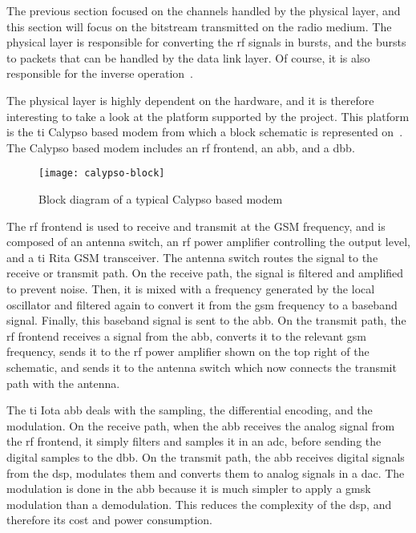     The previous section focused on the channels handled by the physical
    layer, and this section will focus on the bitstream transmitted on
    the radio medium. The physical layer is responsible for converting
    the \gls{rf} signals in bursts, and the bursts to packets that can
    be handled by the data link layer. Of course, it is also responsible
    for the inverse operation~\cite{3gpp_ts_2015-3,osmocombb_2015,welte_anatomy_2010}.

    The physical layer is highly dependent on the hardware, and it is
    therefore interesting to take a look at the platform supported by
    the  project. This platform is the \gls{ti} Calypso
    based modem from which a block schematic is represented
    on~. The Calypso based modem includes an
    \gls{rf} frontend, an \gls{abb}, and a \gls{dbb}.

    \begin{figure}[h]
      \centering
      \texttt{[image: calypso-block]}
      \caption{Block diagram of a typical Calypso based
              modem~\cite{welte_anatomy_2010}}
      \label{fig:calypso_modem}
    \end{figure}

    The \gls{rf} frontend is used to receive and transmit at the GSM
    frequency, and is composed of an antenna switch, an \gls{rf} power
    amplifier controlling the output level, and a \gls{ti} Rita GSM
    transceiver. The antenna switch routes the signal to the receive or
    transmit path. On the receive path, the signal is filtered and
    amplified to prevent noise. Then, it is mixed with a frequency
    generated by the local oscillator and filtered again to convert it
    from the \gls{gsm} frequency to a baseband signal. Finally, this
    baseband signal is sent to the \gls{abb}. On the transmit path, the
    \gls{rf} frontend receives a signal from the \gls{abb}, converts it
    to the relevant \gls{gsm} frequency, sends it to the \gls{rf} power
    amplifier shown on the top right of the schematic, and sends it to
    the antenna switch which now connects the transmit path with the
    antenna.

    The \gls{ti} Iota \gls{abb} deals with the sampling, the
    differential encoding, and the modulation. On the receive path, when
    the \gls{abb} receives the analog signal from the \gls{rf} frontend,
    it simply filters and samples it in an \gls{adc}, before sending the
    digital samples to the \gls{dbb}. On the transmit path, the
    \gls{abb} receives digital signals from the \gls{dsp}, modulates
    them and converts them to analog signals in a \gls{dac}. The
    modulation is done in the \gls{abb} because it is much simpler to
    apply a \gls{gmsk} modulation than a demodulation. This reduces the
    complexity of the \gls{dsp}, and therefore its cost and power
    consumption.

